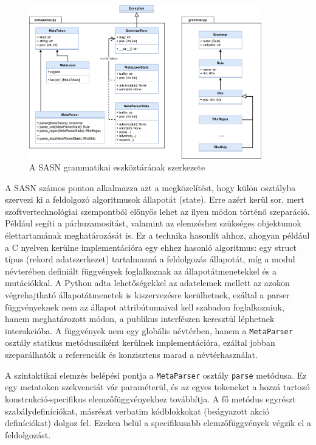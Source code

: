 \documentclass[twoside, 12pt]{report}
\newcommand{\graphicswidth}{0.9\textwidth}
\begin{document}
\vspace{0.5cm}
\begin{figure}[H]
  \centering
  \includegraphics[width=\graphicswidth]{osztaly-diagram-metanyelvtan.png}
  \caption{A SASN grammatikai eszköztárának szerkezete}
\end{figure}

A SASN számos ponton alkalmazza azt a megközelítést, hogy külön osztályba szervezi ki a feldolgozó algoritmusok állapotát (state). Erre azért kerül sor, mert szoftvertechnológiai szempontból előnyös lehet az ilyen módon történő szeparáció. Például segíti a párhuzamosítást, valamint az elemzéshez szükséges objektumok élettartamának meghatározását is. Ez a technika hasonlít ahhoz, ahogyan például a C nyelven kerülne implementációra egy ehhez hasonló algoritmus: egy struct típus (rekord adatszerkezet) tartalmazná a feldolgozás állapotát, míg a modul névterében definiált függvények foglalkoznak az állapotátmenetekkel és a mutációkkal. A Python adta lehetőségekkel az adatelemek mellett az azokon végrehajtható állapotátmenetek is kiszervezésre kerülhetnek, ezáltal a parser függvényeknek nem az állapot attribútumaival kell szabadon foglalkozniuk, hanem meghatározott módon, a publikus interfészen keresztül léphetnek interakcióba. A függvények nem egy globális névtérben, hanem a \verb|MetaParser| osztály statikus metódusaiként kerülnek implementációra, ezáltal jobban szeparálhatók a referenciák és konzisztens marad a névtérhasználat.

A szintaktikai elemzés belépési pontja a \verb|MetaParser| osztály \verb|parse| metódusa. Ez egy metatoken szekvenciát vár paraméterül, és az egyes tokeneket a hozzá tartozó konstrukció-specifikus elemzőfüggvényekhez továbbítja. A fő metódus egyrészt szabálydefiníciókat, másrészt verbatim kódblokkokat (beágyazott akció definíciókat) dolgoz fel. Ezeken belül a specifikusabb elemzőfüggvények végzik el a feldolgozást.
\end{document}
